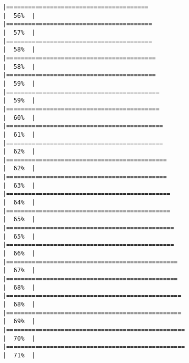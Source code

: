 \documentclass[
]{book}
\begin{document}
\begin{verbatim}
|=======================================                               |  56%  |                                                                              |========================================                              |  57%  |                                                                              |========================================                              |  58%  |                                                                              |=========================================                             |  58%  |                                                                              |=========================================                             |  59%  |                                                                              |==========================================                            |  59%  |                                                                              |==========================================                            |  60%  |                                                                              |===========================================                           |  61%  |                                                                              |===========================================                           |  62%  |                                                                              |============================================                          |  62%  |                                                                              |============================================                          |  63%  |                                                                              |=============================================                         |  64%  |                                                                              |=============================================                         |  65%  |                                                                              |==============================================                        |  65%  |                                                                              |==============================================                        |  66%  |                                                                              |===============================================                       |  67%  |                                                                              |===============================================                       |  68%  |                                                                              |================================================                      |  68%  |                                                                              |================================================                      |  69%  |                                                                              |=================================================                     |  70%  |                                                                              |=================================================                     |  71%  |                                                                              
\end{verbatim}
\end{document}
